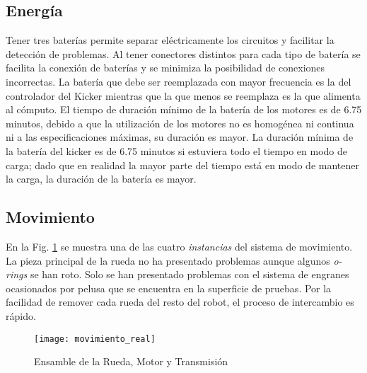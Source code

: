 \subsection{Energía}
Tener tres baterías permite separar eléctricamente los circuitos y facilitar la detección de problemas. Al tener conectores distintos para cada tipo de batería se facilita la conexión de baterías y se minimiza la posibilidad de conexiones incorrectas. La batería que debe ser reemplazada con mayor frecuencia es la del controlador del \gls{Kicker} mientras que la que menos se reemplaza es la que alimenta al cómputo. El tiempo de duración mínimo de la batería de los motores es de 6.75 minutos, debido a que la utilización de los motores no es homogénea ni continua ni a las especificaciones máximas, su duración es mayor. La duración mínima de la batería del kicker es de 6.75 minutos si estuviera todo el tiempo en modo de carga; dado que en realidad la mayor parte del tiempo está en modo de mantener la carga, la duración de la batería es mayor.


\subsection{Movimiento}
En la Fig. \ref{fig:mov_real} se muestra una de las cuatro \textit{instancias} del sistema de movimiento. La pieza principal de la rueda no ha presentado problemas aunque algunos \textit{o-rings} se han roto. Solo se han presentado  problemas con el sistema de engranes ocasionados por pelusa que se encuentra en la superficie de pruebas. Por la facilidad de remover cada rueda del resto del robot, el proceso de intercambio es rápido.


\begin{figure}
	\centering
		\texttt{[image: movimiento\_real]}
	\caption{Ensamble de la Rueda, Motor y Transmisión}
	\label{fig:mov_real}
\end{figure}

